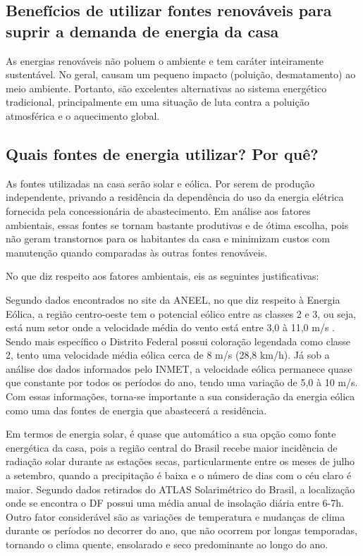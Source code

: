 \subsection{Benefícios de utilizar fontes renováveis para suprir a demanda de energia da casa}

	As energias renováveis não poluem o ambiente e tem caráter inteiramente sustentável. No geral, causam um pequeno impacto (poluição, desmatamento) ao meio ambiente. Portanto, são excelentes alternativas ao sistema energético tradicional, principalmente em uma situação de luta contra a poluição atmosférica e o aquecimento global.

\subsection{Quais fontes de energia utilizar? Por quê?}

	As fontes utilizadas na casa serão solar e eólica. Por serem de produção independente, privando a residência da dependência do uso da energia elétrica fornecida pela concessionária de abastecimento. Em análise aos fatores ambientais, essas fontes se tornam bastante produtivas e de ótima escolha, pois não geram transtornos para os habitantes da casa e minimizam custos com manutenção quando comparadas às outras fontes renováveis.\cite{brasilescolafontesrenovaveis}

	No que diz respeito aos fatores ambientais, eis as seguintes justificativas:

	Segundo dados encontrados no site da ANEEL, no que diz respeito à Energia Eólica, a região centro-oeste tem o potencial eólico entre as classes 2 e 3, ou seja, está num setor onde a velocidade média do vento está entre 3,0 à 11,0 m/s \cite{americadosolperguntasfrequentes}. Sendo mais específico o Distrito Federal possui coloração legendada como classe 2, tento uma velocidade média eólica cerca de 8 m/s (28,8 km/h). Já sob a análise dos dados informados pelo INMET, a velocidade eólica permanece quase que constante por todos os períodos do ano, tendo uma variação de 5,0 à 10 m/s. Com essas informações, torna-se importante a sua consideração da energia eólica como uma das fontes de energia que abastecerá a residência.\cite{atlaseolico}


	Em termos de energia solar, é quase que automático a sua opção como fonte energética da casa, pois a região central do Brasil recebe maior incidência de radiação solar durante as estações secas, particularmente entre os meses de julho a setembro, quando a precipitação é baixa e o número de dias com o céu claro é maior\cite{portalsolar}. Segundo dados retirados do ATLAS Solarimétrico do Brasil\cite{ufpe2000}, a localização onde se encontra o DF possui uma média anual de insolação diária entre 6-7h. Outro fator considerável são as variações de temperatura e mudanças de clima durante os períodos no decorrer do ano, que não ocorrem por longas temporadas, tornando o clima quente, ensolarado e seco predominante ao longo do ano.

